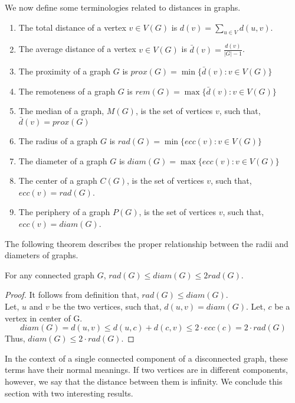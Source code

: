 We now define some terminologies related to distances in graphs.
\begin{enumerate}
    \item The total distance of a vertex $v \in V(G)$ is $d(v)=\sum_{u \in V} d(u,v)$.
    \item The average distance of a vertex $v \in V(G)$ is $\bar{d}(v)=\frac{d(v)}{|G|-1}$.
    \item The proximity of a graph $G$ is $prox(G)=\min \{\bar{d}(v) : v \in V(G)\}$
    \item The remoteness of a graph $G$ is $rem(G)=\max \{\bar{d}(v) : v \in V(G)\}$ 
    \item The median of a graph, $M(G)$, is the set of vertices $v$, such that, $\bar{d}(v)=prox(G)$
    \item The radius of a graph $G$ is $rad(G)=\min \{ecc(v) : v \in V(G)\}$
    \item The diameter of a graph $G$ is $diam(G)=\max \{ecc(v) : v \in V(G)\}$
    \item The center of a graph $C(G)$, is the set of vertices $v$, such that, $ecc(v)=rad(G)$.
    \item The periphery of a graph $P(G)$, is the set of vertices $v$, such that, $ecc(v)=diam(G)$.
\end{enumerate}

The following theorem describes the proper relationship between the radii and
diameters of graphs.

\begin{thm}
    For any connected graph $G$, $rad(G) \le diam(G) \le 2rad(G)$.
\end{thm}
\begin{proof}
    It follows from definition that, $rad(G) \le diam(G)$.\\
    Let, $u$ and $v$ be the two vertices, such that, $d(u,v)=diam(G)$. Let, $c$ be a vertex in center of G.\\
    \begin{equation*}
        diam(G)=d(u,v) \le d(u,c)+d(c,v) \le 2\cdot ecc(c)=2\cdot rad(G)
    \end{equation*}
    Thus, $diam(G) \le 2\cdot rad(G)$.
\end{proof}

In the context of a single connected component of a disconnected graph, these terms have their normal meanings. If two vertices are in different components, however, we say that the distance between them is infinity. We conclude this section with two interesting results.

